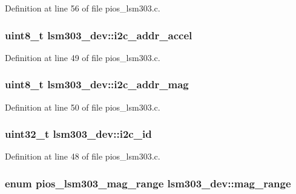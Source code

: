 \-Definition at line 56 of file pios\-\_\-lsm303.\-c.

\hypertarget{structlsm303__dev_a43a431687ad3d1280504751dd67b99ad}{
\subsubsection[{i2c\-\_\-addr\-\_\-accel}]{\setlength{\rightskip}{0pt plus 5cm}uint8\-\_\-t {\bf lsm303\-\_\-dev\-::i2c\-\_\-addr\-\_\-accel}}}\label{structlsm303__dev_a43a431687ad3d1280504751dd67b99ad}


\-Definition at line 49 of file pios\-\_\-lsm303.\-c.

\hypertarget{structlsm303__dev_a43b3cb1f2405df34e8542d968e9eb321}{
\subsubsection[{i2c\-\_\-addr\-\_\-mag}]{\setlength{\rightskip}{0pt plus 5cm}uint8\-\_\-t {\bf lsm303\-\_\-dev\-::i2c\-\_\-addr\-\_\-mag}}}\label{structlsm303__dev_a43b3cb1f2405df34e8542d968e9eb321}


\-Definition at line 50 of file pios\-\_\-lsm303.\-c.

\hypertarget{structlsm303__dev_a30d3092e0b3541399e2901bf71a0e6c2}{
\subsubsection[{i2c\-\_\-id}]{\setlength{\rightskip}{0pt plus 5cm}uint32\-\_\-t {\bf lsm303\-\_\-dev\-::i2c\-\_\-id}}}\label{structlsm303__dev_a30d3092e0b3541399e2901bf71a0e6c2}


\-Definition at line 48 of file pios\-\_\-lsm303.\-c.

\hypertarget{structlsm303__dev_a9c4089c3f5674a6fc5d51d06d90501cc}{
\subsubsection[{mag\-\_\-range}]{\setlength{\rightskip}{0pt plus 5cm}enum {\bf pios\-\_\-lsm303\-\_\-mag\-\_\-range} {\bf lsm303\-\_\-dev\-::mag\-\_\-range}}}\label{structlsm303__dev_a9c4089c3f5674a6fc5d51d06d90501cc}


